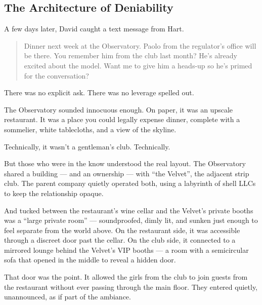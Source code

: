 \subsection{The Architecture of Deniability}

A few days later, David caught a text message from Hart.

\begin{quote}
  Dinner next week at the Observatory. Paolo from the regulator’s office will be there. You remember him from the club 
  last month? He’s already excited about the model. Want me to give him a heads-up so he’s primed for the conversation?
\end{quote}

There was no explicit ask. There was no leverage spelled out.

The Observatory sounded innocuous enough. On paper, it was an upscale restaurant. It was a place you could legally expense 
dinner, complete with a sommelier, white tablecloths, and a view of the skyline.  

Technically, it wasn’t a gentleman’s club. Technically.

But those who were in the know understood the real layout. The Observatory shared a building --- and an ownership --- with 
``the Velvet'', the adjacent strip club. The parent company quietly operated both, using a labyrinth of shell 
LLCs to keep the relationship opaque.

And tucked between the restaurant’s wine cellar and the Velvet’s private booths was a “large private room” — soundproofed, 
dimly lit, and sunken just enough to feel separate from the world above. On the restaurant side, it was accessible through 
a discreet door past the cellar. On the club side, it connected to a mirrored lounge behind the Velvet’s VIP booths — a 
room with a semicircular sofa that opened in the middle to reveal a hidden door.

That door was the point. It allowed the girls from the club to join guests from the restaurant without ever passing through 
the main floor. They entered quietly, unannounced, as if part of the ambiance. 

\medskip

